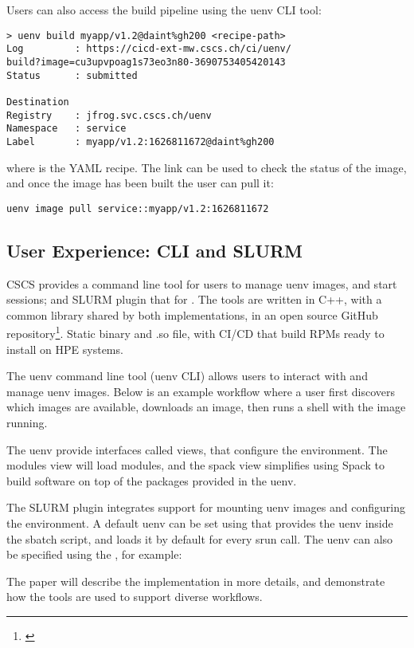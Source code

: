 Users can also access the build pipeline using the uenv CLI tool:
\begin{lstlisting}
> uenv build myapp/v1.2@daint%gh200 <recipe-path>
Log         : https://cicd-ext-mw.cscs.ch/ci/uenv/
build?image=cu3upvpoag1s73eo3n80-3690753405420143
Status      : submitted

Destination
Registry    : jfrog.svc.cscs.ch/uenv
Namespace   : service
Label       : myapp/v1.2:1626811672@daint%gh200
\end{lstlisting}
where  is the YAML recipe.
The link can be used to check the status of the image, and once the image has been built the user can pull it:
\begin{lstlisting}
uenv image pull service::myapp/v1.2:1626811672
\end{lstlisting}

\subsection{User Experience: CLI and SLURM}
\label{sec:cli}

CSCS provides a command line tool for users to manage uenv images, and start sessions; and SLURM plugin that for .
The tools are written in C++, with a common library shared by both implementations, in an open source GitHub repository\footnote{\href{https://github.com/eth-cscs/uenv2}{}}.
Static binary and .so file, with CI/CD that build RPMs ready to install on HPE systems.

The uenv command line tool (uenv CLI) allows users to interact with and manage uenv images.
Below is an example workflow where a user first discovers which images are available, downloads an image, then runs a shell with the image running.



The uenv provide interfaces called views, that configure the environment.
The modules view will load modules, and the spack view simplifies using Spack to build software on top of the packages provided in the uenv.

The SLURM plugin integrates support for mounting uenv images and configuring the environment.
A default uenv can be set using  that provides the uenv inside the sbatch script, and loads it by default for every srun call.
The uenv can also be specified using the , for example:


The paper will describe the implementation in more details, and demonstrate how the tools are used to support diverse workflows.
